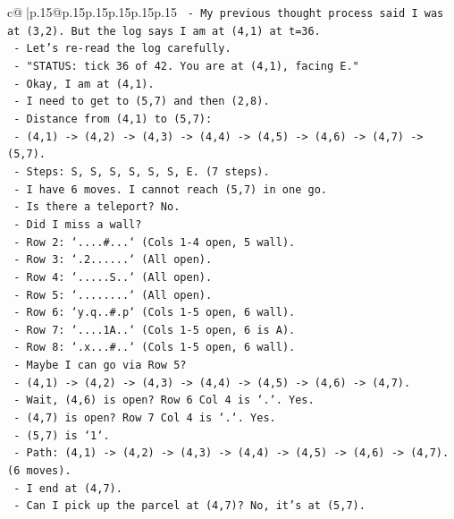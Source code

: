 \documentclass{article}
\begin{document}
{\begin{supertabular}{c@{$\;$}|p{.15\linewidth}@{}p{.15\linewidth}p{.15\linewidth}p{.15\linewidth}p{.15\linewidth}p{.15\linewidth}}
{{{\texttt{   {-} My previous thought process said I was at (3,2). But the log says I am at (4,1) at t=36.} \\
\texttt{   {-} Let's re{-}read the log carefully.} \\
\texttt{   {-} "STATUS: tick 36 of 42. You are at (4,1), facing E."} \\
\texttt{   {-} Okay, I am at (4,1).} \\
\texttt{   {-} I need to get to (5,7) and then (2,8).} \\
\texttt{   {-} Distance from (4,1) to (5,7):} \\
\texttt{     {-} (4,1) {-}> (4,2) {-}> (4,3) {-}> (4,4) {-}> (4,5) {-}> (4,6) {-}> (4,7) {-}> (5,7).} \\
\texttt{     {-} Steps: S, S, S, S, S, S, E. (7 steps).} \\
\texttt{     {-} I have 6 moves. I cannot reach (5,7) in one go.} \\
\texttt{   {-} Is there a teleport? No.} \\
\texttt{   {-} Did I miss a wall?} \\
\texttt{     {-} Row 2: `....\#...` (Cols 1{-}4 open, 5 wall).} \\
\texttt{     {-} Row 3: `.2......` (All open).} \\
\texttt{     {-} Row 4: `.....S..` (All open).} \\
\texttt{     {-} Row 5: `........` (All open).} \\
\texttt{     {-} Row 6: `y.q..\#.p` (Cols 1{-}5 open, 6 wall).} \\
\texttt{     {-} Row 7: `....1A..` (Cols 1{-}5 open, 6 is A).} \\
\texttt{     {-} Row 8: `.x...\#..` (Cols 1{-}5 open, 6 wall).} \\
\texttt{   {-} Maybe I can go via Row 5?} \\
\texttt{     {-} (4,1) {-}> (4,2) {-}> (4,3) {-}> (4,4) {-}> (4,5) {-}> (4,6) {-}> (4,7).} \\
\texttt{     {-} Wait, (4,6) is open? Row 6 Col 4 is `.`. Yes.} \\
\texttt{     {-} (4,7) is open? Row 7 Col 4 is `.`. Yes.} \\
\texttt{     {-} (5,7) is `1`.} \\
\texttt{     {-} Path: (4,1) {-}> (4,2) {-}> (4,3) {-}> (4,4) {-}> (4,5) {-}> (4,6) {-}> (4,7). (6 moves).} \\
\texttt{     {-} I end at (4,7).} \\
\texttt{     {-} Can I pick up the parcel at (4,7)? No, it's at (5,7).} \\
}}}
\end{supertabular}}
\end{document}

